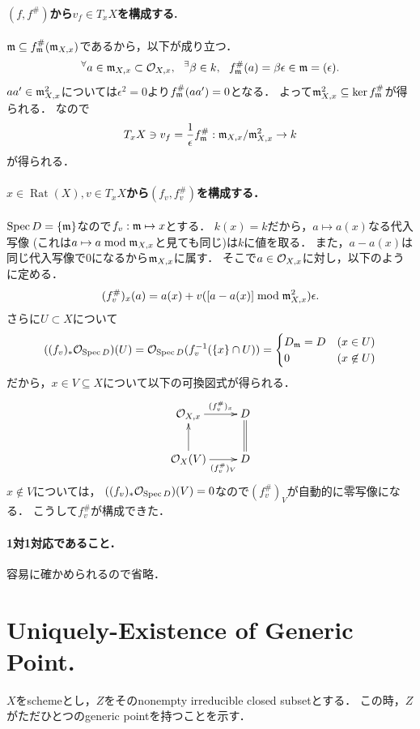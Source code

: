 \documentclass[a4paper]{jsarticle}
\newcommand{\Rat}{\operatorname{Rat}} %
\begin{document}
    \paragraph{$(f,f^{\#})$から$v_f \in T_x X$を構成する.}
    $\mathfrak{m} \subseteq f^{\#}_{\mathfrak{m}}(\mathfrak{m}_{X,x})$であるから，以下が成り立つ．
    \[
        {}^{\forall} a \in \mathfrak{m}_{X,x} \subset \mathcal{O}_{X,x},~~ {}^{\exists} \beta \in k,~~
        f_{\mathfrak{m}}^{\#}(a)=\beta \epsilon \in \mathfrak{m}=(\epsilon).
    \]
    $aa' \in \mathfrak{m}_{X,x}^2$については$\epsilon^2=0$より$f_{\mathfrak{m}}^{\#}(aa')=0$となる．
    よって$\mathfrak{m}_{X,x}^2 \subseteq \ker f_{\mathfrak{m}}^{\#}$が得られる．
    なので
    \[ T_x X \ni v_f=\frac{1}{\epsilon}f_{\mathfrak{m}}^{\#}: \mathfrak{m}_{X,x}/\mathfrak{m}_{X,x}^2 \to k \]
    が得られる．

    \paragraph{$x \in \Rat(X), v \in T_x X$から$(f_v,f_v^{\#})$を構成する．}
    $\operatorname{Spec} D=\{\mathfrak{m}\}$なので$f_v: \mathfrak{m} \mapsto x$とする．
    $k(x)=k$だから，$a \mapsto a(x)$なる代入写像
    (これは$a \mapsto a \bmod \mathfrak{m}_{X,x}$と見ても同じ)は$k$に値を取る．
    また，$a-a(x)$は同じ代入写像で0になるから$\mathfrak{m}_{X,x}$に属す．
    そこで$a \in \mathcal{O}_{X,x}$に対し，以下のように定める．
    \[ (f_v^{\#})_x(a)=a(x)+v([a-a(x)] \bmod \mathfrak{m}_{X,x}^2)\epsilon. \]
    さらに$U \subset X$について
    \[
        ((f_v)_* \mathcal{O}_{\operatorname{Spec} D})(U)
        =\mathcal{O}_{\operatorname{Spec} D}(f_v^{-1}(\{x\} \cap U))
        =
        \begin{cases}{}
            D_{\mathfrak{m}}=D & (x \in U) \\
            0   & (x \not \in U)
        \end{cases}
    \]
    だから，$x \in V \subseteq X$について以下の可換図式が得られる．
    \[
    \xymatrix
    {
    \shO_{X,x} \ar[r]^-{(f_v^{\#})_x} & D \\
    \shO_{X}(V) \ar[r]_-{(f_v^{\#})_V} \ar[u]& D \ar@{=}[u]
    }
    \]
    $x \not \in V$については，
    $((f_v)_* \mathcal{O}_{\operatorname{Spec} D})(V)=0$なので$(f_v^{\#})_V$が自動的に零写像になる．
    こうして$f_v^{\#}$が構成できた．

    \paragraph{1対1対応であること．}
    容易に確かめられるので省略．

\section{Uniquely-Existence of Generic Point.} %
    $X$をschemeとし，$Z$をそのnonempty irreducible closed subsetとする．
    この時，$Z$がただひとつのgeneric pointを持つことを示す．
\end{document}
